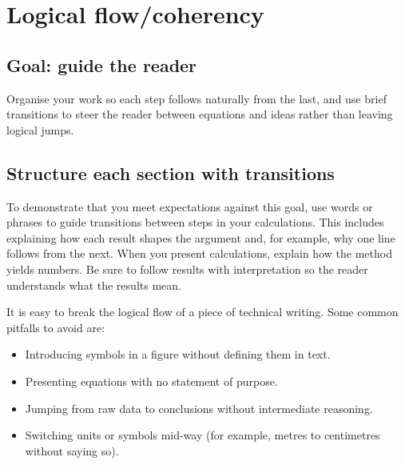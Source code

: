 \documentclass[
  a4paper,
  DIV=11,
  numbers=noendperiod,
  oneside]{scrreprt}
\providecommand{\tightlist}{%
  \setlength{\itemsep}{0pt}\setlength{\parskip}{0pt}}
\begin{document}
\section{Logical flow/coherency}\label{sec-writing-coherency}

\subsection{Goal: guide the reader}\label{goal-guide-the-reader}

Organise your work so each step follows naturally from the last, and use
brief transitions to steer the reader between equations and ideas rather
than leaving logical jumps.

\subsection{Structure each section with
transitions}\label{structure-each-section-with-transitions}

To demonstrate that you meet expectations against this goal, use words
or phrases to guide transitions between steps in your calculations. This
includes explaining how each result shapes the argument and, for
example, why one line follows from the next. When you present
calculations, explain how the method yields numbers. Be sure to follow
results with interpretation so the reader understands what the results
mean.

\begin{tcolorbox}[enhanced jigsaw, opacitybacktitle=0.6, colframe=quarto-callout-warning-color-frame, bottomrule=.15mm, coltitle=black, colback=white, title=\textcolor{quarto-callout-warning-color}{\faExclamationTriangle}\hspace{0.5em}{Avoid common flow breakers}, breakable, toptitle=1mm, arc=.35mm, left=2mm, opacityback=0, rightrule=.15mm, bottomtitle=1mm, colbacktitle=quarto-callout-warning-color!10!white, toprule=.15mm, leftrule=.75mm, titlerule=0mm]

It is easy to break the logical flow of a piece of technical writing.
Some common pitfalls to avoid are:

\begin{itemize}
\tightlist
\item
  Introducing symbols in a figure without defining them in text.
\item
  Presenting equations with no statement of purpose.
\item
  Jumping from raw data to conclusions without intermediate reasoning.
\item
  Switching units or symbols mid-way (for example, metres to centimetres
  without saying so).
\end{itemize}

\end{tcolorbox}
\end{document}
